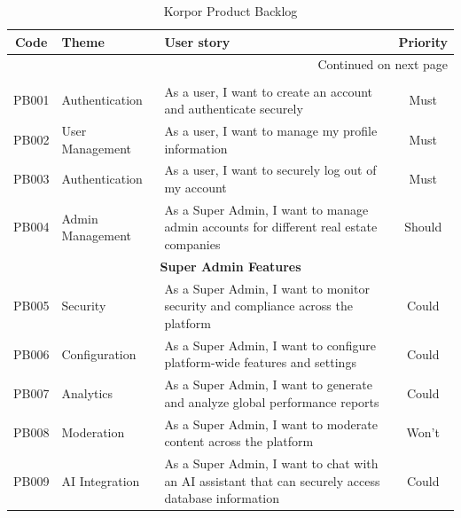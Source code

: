 \begin{longtable}{|c|l|p{8cm}|c|}
    \caption{Korpor Product Backlog\label{tab:product-backlog}} \\
        \hline
        \textbf{Code} & \textbf{Theme} & \textbf{User story} & \textbf{Priority} \\
        \hline
    \endfirsthead
    
    \hline
    \endhead
    
    \hline \multicolumn{4}{|r|}{{Continued on next page}} \\ \hline
    \endfoot
    
    \hline
    \endlastfoot
    
    \multicolumn{4}{|c|}{\cellcolor{primary!15}\textbf{\textcolor{primary}{Authentication \& User Management}}} \\
    \hline
    PB001 & Authentication & As a user, I want to create an account and authenticate securely & Must \\
    \hline
    PB002 & User Management & As a user, I want to manage my profile information & Must \\
    \hline
    PB003 & Authentication & As a user, I want to securely log out of my account & Must \\
    \hline
    PB004 & Admin Management & As a Super Admin, I want to manage admin accounts for different real estate companies & Should \\
    
    
    \multicolumn{4}{|c|}{\cellcolor{primary!15}\textbf{\textcolor{primary}{Super Admin Features}}} \\
    \hline
    PB005 & Security & As a Super Admin, I want to monitor security and compliance across the platform & Could \\
    \hline
    PB006 & Configuration & As a Super Admin, I want to configure platform-wide features and settings & Could \\
    \hline
    PB007 & Analytics & As a Super Admin, I want to generate and analyze global performance reports & Could \\
    \hline
    PB008 & Moderation & As a Super Admin, I want to moderate content across the platform & Won't \\
    \hline
    PB009 & AI Integration & As a Super Admin, I want to chat with an AI assistant that can securely access database information & Could \\
    \hline
    

\end{longtable}
